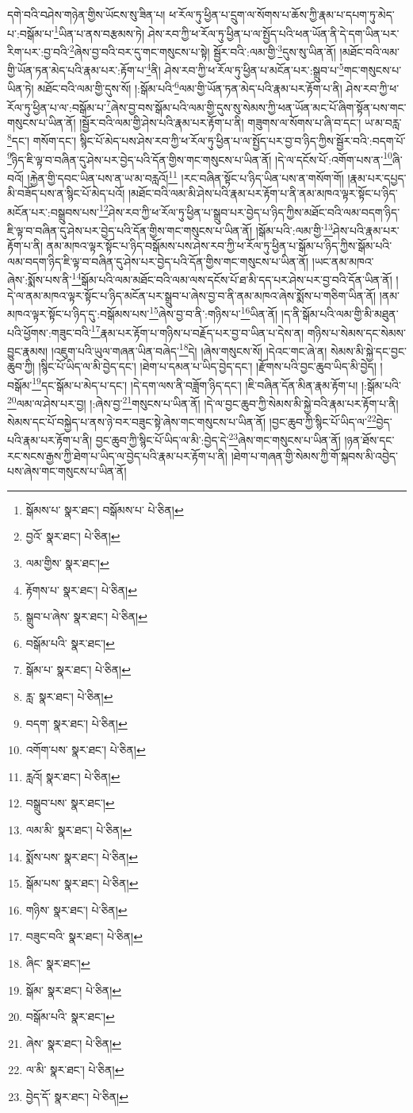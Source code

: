 དགེ་བའི་བཤེས་གཉེན་གྱིས་ཡོངས་སུ་ཟིན་པ། ཕ་རོལ་ཏུ་ཕྱིན་པ་དྲུག་ལ་སོགས་པ་ཆོས་ཀྱི་རྣམ་པ་དཔག་ཏུ་མེད་པ་:བསྒོམ་པ་\footnote{སྒོམས་པ་  སྣར་ཐང་། བསྒོམས་པ་  པེ་ཅིན། }ཡིན་པ་ནས་བརྩམས་ཏེ། ཤེས་རབ་ཀྱི་ཕ་རོལ་ཏུ་ཕྱིན་པ་ལ་སྤྱོད་པའི་ཕན་ཡོན་ནི་དེ་དག་ཡིན་པར་རིག་པར་:བྱ་བའི་\footnote{བྱའོ་  སྣར་ཐང་།  པེ་ཅིན། }ཞེས་བྱ་བའི་བར་དུ་གང་གསུངས་པ་སྟེ། སྦྱོར་བའི་:ལམ་གྱི་\footnote{ལམ་གྱིས་  སྣར་ཐང་། }དུས་སུ་ཡིན་ནོ། །མཐོང་བའི་ལམ་གྱི་ཡོན་ཏན་མེད་པའི་རྣམ་པར་:རྟོག་པ་\footnote{རྟོགས་པ་  སྣར་ཐང་།  པེ་ཅིན། }ནི། ཤེས་རབ་ཀྱི་ཕ་རོལ་ཏུ་ཕྱིན་པ་མངོན་པར་:སྒྲུབ་པ་\footnote{སྒྲུབ་པ་ཞེས་  སྣར་ཐང་།  པེ་ཅིན། }གང་གསུངས་པ་ཡིན་ཏེ། མཐོང་བའི་ལམ་གྱི་དུས་སོ། །:སྒོམ་པའི་\footnote{བསྒོམ་པའི་  སྣར་ཐང་། }ལམ་གྱི་ཡོན་ཏན་མེད་པའི་རྣམ་པར་རྟོག་པ་ནི། ཤེས་རབ་ཀྱི་ཕ་རོལ་ཏུ་ཕྱིན་པ་ལ་:བསྒོམ་པ་\footnote{སྒོམ་པ་  སྣར་ཐང་།  པེ་ཅིན། }ཞེས་བྱ་བས་སྒོམ་པའི་ལམ་གྱི་དུས་སུ་སེམས་ཀྱི་ཕན་ཡོན་མང་པོ་ཞིག་སྟོན་པས་གང་གསུངས་པ་ཡིན་ནོ། །སྦྱོར་བའི་ལམ་གྱི་ཤེས་པའི་རྣམ་པར་རྟོག་པ་ནི། གཟུགས་ལ་སོགས་པ་ཞི་བ་དང་། ཡ་མ་བརླ་\footnote{རླ་  སྣར་ཐང་།  པེ་ཅིན། }དང་། གསོག་དང་། སྙིང་པོ་མེད་པས་ཤེས་རབ་ཀྱི་ཕ་རོལ་ཏུ་ཕྱིན་པ་ལ་སྤྱོད་པར་བྱ་བ་ཉིད་ཀྱིས་སྦྱོར་བའི་:བདག་པོ་\footnote{བདག་  སྣར་ཐང་།  པེ་ཅིན། }ཉིད་ཇི་ལྟ་བ་བཞིན་དུ་ཤེས་པར་བྱེད་པའི་དོན་གྱིས་གང་གསུངས་པ་ཡིན་ནོ། །དེ་ལ་དངོས་པོ་:འགོག་པས་ན་\footnote{འགོག་པས་  སྣར་ཐང་།  པེ་ཅིན། }ཞི་བའོ། །རྐྱེན་གྱི་དབང་ཡིན་པས་ན་ཡ་མ་བརླའོ།\footnote{རླའོ།  སྣར་ཐང་།  པེ་ཅིན། } །རང་བཞིན་སྟོང་པ་ཉིད་ཡིན་པས་ན་གསོག་གོ། །རྣམ་པར་དཔྱད་མི་བཟོད་པས་ན་སྙིང་པོ་མེད་པའོ། །མཐོང་བའི་ལམ་མི་ཤེས་པའི་རྣམ་པར་རྟོག་པ་ནི་ནམ་མཁའ་ལྟར་སྟོང་པ་ཉིད་མངོན་པར་:བསྒྲུབས་པས་\footnote{བསྒྲུབ་པས་  སྣར་ཐང་། }ཤེས་རབ་ཀྱི་ཕ་རོལ་ཏུ་ཕྱིན་པ་སྒྲུབ་པར་བྱེད་པ་ཉིད་ཀྱིས་མཐོང་བའི་ལམ་བདག་ཉིད་ཇི་ལྟ་བ་བཞིན་དུ་ཤེས་པར་བྱེད་པའི་དོན་གྱིས་གང་གསུངས་པ་ཡིན་ནོ། །སྒོམ་པའི་:ལམ་གྱི་\footnote{ལམ་མི་  སྣར་ཐང་།  པེ་ཅིན། }ཤེས་པའི་རྣམ་པར་རྟོག་པ་ནི། ནམ་མཁའ་ལྟར་སྟོང་པ་ཉིད་བསྒོམས་པས་ཤེས་རབ་ཀྱི་ཕ་རོལ་ཏུ་ཕྱིན་པ་སྒོམ་པ་ཉིད་ཀྱིས་སྒོམ་པའི་ལམ་བདག་ཉིད་ཇི་ལྟ་བ་བཞིན་དུ་ཤེས་པར་བྱེད་པའི་དོན་གྱིས་གང་གསུངས་པ་ཡིན་ནོ། །ཡང་ནམ་མཁའ་ཞེས་:སྨོས་པས་ནི་\footnote{སྨོས་པས་  སྣར་ཐང་།  པེ་ཅིན། }སྒོམ་པའི་ལམ་མཐོང་བའི་ལམ་ལས་དངོས་པོ་ཐ་མི་དད་པར་ཤེས་པར་བྱ་བའི་དོན་ཡིན་ནོ། །དེ་ལ་ནམ་མཁའ་ལྟར་སྟོང་པ་ཉིད་མངོན་པར་སྒྲུབ་པ་ཞེས་བྱ་བ་ནི་ནམ་མཁའ་ཞེས་སྨོས་པ་གཅིག་ཡིན་ནོ། །ནམ་མཁའ་ལྟར་སྟོང་པ་ཉིད་དུ་:བསྒོམས་པས་\footnote{སྒོམ་པས་  སྣར་ཐང་།  པེ་ཅིན། }ཞེས་བྱ་བ་ནི་:གཉིས་པ་\footnote{གཉིས་  སྣར་ཐང་།  པེ་ཅིན། }ཡིན་ནོ། །ད་ནི་སྒོམ་པའི་ལམ་གྱི་མི་མཐུན་པའི་ཕྱོགས་:གཟུང་བའི་\footnote{བཟུང་བའི་  སྣར་ཐང་།  པེ་ཅིན། }རྣམ་པར་རྟོག་པ་གཉིས་པ་བརྗོད་པར་བྱ་བ་ཡིན་པ་དེས་ན། གཉིས་པ་སེམས་དང་སེམས་བྱུང་རྣམས། །འཇུག་པའི་ཡུལ་གཞན་ཡིན་བཞེད་\footnote{ཞིང་  སྣར་ཐང་། }དེ། །ཞེས་གསུངས་སོ། །དེའང་གང་ཞེ་ན། སེམས་མི་སྐྱེ་དང་བྱང་ཆུབ་ཀྱི། །སྙིང་པོ་ཡིད་ལ་མི་བྱེད་དང་། །ཐེག་པ་དམན་པ་ཡིད་བྱེད་དང་། །རྫོགས་པའི་བྱང་ཆུབ་ཡིད་མི་བྱེད། །བསྒོམ་\footnote{སྒོམ་  སྣར་ཐང་།  པེ་ཅིན། }དང་སྒོམ་པ་མེད་པ་དང་། །དེ་དག་ལས་ནི་བཟློག་ཉིད་དང་། །ཇི་བཞིན་དོན་མིན་རྣམ་རྟོག་པ། །:སྒོམ་པའི་\footnote{བསྒོམ་པའི་  སྣར་ཐང་། }ལམ་ལ་ཤེས་པར་བྱ། །:ཞེས་བྱ་\footnote{ཞེས་  སྣར་ཐང་།  པེ་ཅིན། }གསུངས་པ་ཡིན་ནོ། །དེ་ལ་བྱང་ཆུབ་ཀྱི་སེམས་མི་སྐྱེ་བའི་རྣམ་པར་རྟོག་པ་ནི། སེམས་དང་པོ་བསྐྱེད་པ་ནས་ཉེ་བར་བཟུང་སྟེ་ཞེས་གང་གསུངས་པ་ཡིན་ནོ། །བྱང་ཆུབ་ཀྱི་སྙིང་པོ་ཡིད་ལ་\footnote{ལ་མི་  སྣར་ཐང་།  པེ་ཅིན། }བྱེད་པའི་རྣམ་པར་རྟོག་པ་ནི། བྱང་ཆུབ་ཀྱི་སྙིང་པོ་ཡིད་ལ་མི་:བྱེད་དེ་\footnote{བྱེད་དོ་  སྣར་ཐང་།  པེ་ཅིན། }ཞེས་གང་གསུངས་པ་ཡིན་ནོ། །ཉན་ཐོས་དང་རང་སངས་རྒྱས་ཀྱི་ཐེག་པ་ཡིད་ལ་བྱེད་པའི་རྣམ་པར་རྟོག་པ་ནི། །ཐེག་པ་གཞན་གྱི་སེམས་ཀྱི་གོ་སྐབས་མི་འབྱེད་པས་ཞེས་གང་གསུངས་པ་ཡིན་ནོ། 